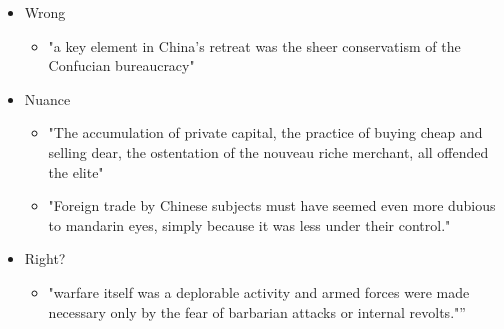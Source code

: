 \documentclass[letterpaper]{article}
\begin{document}
\begin{itemize}
\item Wrong

\begin{itemize}
\item "a key element in China's retreat was the sheer conservatism of the
Confucian bureaucracy"
\end{itemize}

\item Nuance

\begin{itemize}
\item "The accumulation of private capital, the practice of buying cheap
and selling dear, the ostentation of the nouveau riche merchant, all
offended the elite"
\item "Foreign trade by Chinese subjects must have seemed even more
dubious to mandarin eyes, simply because it was less under their
control."
\end{itemize}

\item Right?

\begin{itemize}
\item "warfare itself was a deplorable activity and armed forces were made
necessary only by the fear of barbarian attacks or internal
revolts."”
\end{itemize}
\end{itemize}
\end{document}
